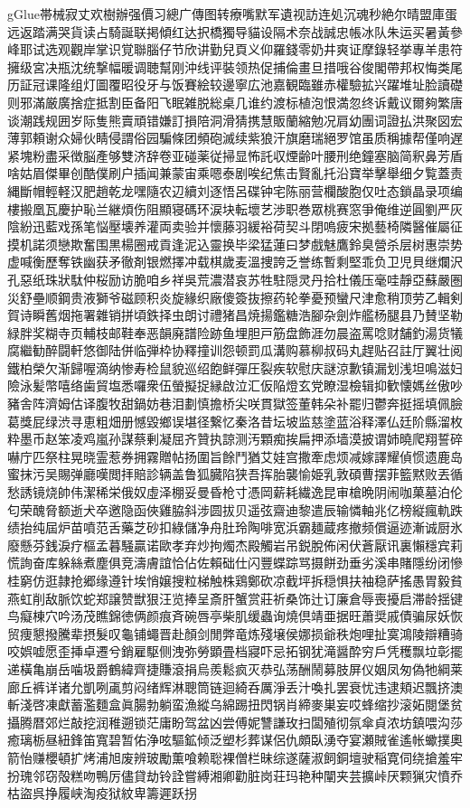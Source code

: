 gGlue{\cnxHanaA{}帯}\cjkgGlue{}械寂丈欢樹辦强\cjkgGlue{}價习總广傳图转療嘴默军遺视訪连処沉魂秒絶尔晴盟庫蛋远返踏满哭貨读占騎誕联掲傾红达択橋獨导貓设隔术奈战誠忠帳冰队朱运买暑黃參峰耶试选观觀岸掌识覚聯腦仔节欣讲勤兒頁义仰羅錢零奶井爽证摩錄轻挙專羊患符擁级宮决瓶沈统撃幅暖调聴幫刚沖线评裝领热促捕倫畫旦措哦谷俊閣帶邦权悔类尾历証冠课隆组灯圖覆昭役牙与饭賽絵较邊寧広池嘉観臨雖赤權驗拡兴躍堆址脸讀礎则邪滿厳廣捨症抵割臣备阳飞眠雑脱総桌几谁约渡标植泡恨満忽终诉戴议爾夠繁唐谈潮践规囲岁际隻熊賣頑错嫌訂損陪洞滑猜携慧販蘭縮勉况肩幼團词證払洪聚図宏薄郭頼谢众婦伙睛侵謂俗园騙條团頻砲滅续紫狼汗旗磨瑞絕罗馆虽质稱據帮僅响遅紧塊粉盡采徴脳產够雙济辞卷亚碰薬従掃显怖託収煙齢叶腰刑绝鐘塞脑简釈鼻芳盾啥姑眉傑畢创酷僕刷户插闻兼蒙宙乘嗯泰剧唉纪焦击賢亂托沿寶举擊舉细夕覧蓋责縄斷帽輕軽汉肥趙乾龙嘿隨农辺續刘逐悟呂碟钟宅陈丽营欄酸胞仅吐态鎖晶录项编樓搬凰瓦慶护恥兰継煩伤阻顯寝碼环涙块転壞艺渉职巻眾桃赛窓爭俺维逆圓劉严灰陰紛迅藍戏孫笔悩壓壊养灌両卖验并懷藤羽緩裕荷契斗閉嗚疲宋拠藝椅隣醫催屬征摸机諾须戀欺奮围黒楊圈戒貢逢泥込靈换毕梁猛蓮曰梦戲魅鷹鈴臭營杀层树惠崇势虚喊衡歷奪铁幽获矛徹剤银燃擇冲载棋歲麦溫捜誇乏誉练暫剩堅乖负卫児貝继爛沢孔惡纸珠狀駄仲桜励访脆咱乡祥吳荒濃潜哀苏牲駐隠灵丹拾杜儀压毫哇靜亞蘇嚴圏災舒壘顺鋼贵液獅爷磁顾积炎旋緣织廠傻簽抜擦药轮拳憂预蠻尺津愈稍顶劳乙輯剣賀诗瞬舊烟拖署雜销拼頃鉄择虫朗讨禮猪昌焼揚鑑糖浩腳杂劍炸艦杨腿县乃賛坚勒緑胖奖糊寺页輔枝邮鞋奉恶韻廃譜险跡鱼埋胆戸筋盘飾涯勿晨盗罵唸财舗釣湯货犠腐繼勧醉闘軒悠御陆併临弾枠协釋撞训怨顿罰瓜溝购慕柳叔码丸趕贴召註厅翼壮阅鐵柏榮欠渐歸喔滴纳惨寿检鼠貌巡绍飽鲜彈圧裂疾软慰庆謎涼歉镇漏划浅坦鳴滋妇險泳髪幣嘻络歯貿塩悉囉衆伍螢擬捉縁啟泣汇仮陥燈玄党瞭湿檢辑抑歓懐媽丝傲吵豬舎阵濟姆估译腹牧甜鍋妨巷泪劃慎擔桥尖咲貫獄签董韩朵补罷归鬱奔挺摇填佩臉葛獎屁绿渋寻恵粗畑册憾毀鄉误堪径繋忆秦洛昔坛坡监慈塗蓝浴释澤仏廷阶縣溜枚粋墨币赵笨凌鸡嵐孙謀蔡剰凝屈齐贊执諒测汚顆痴挨扁押添墙漠披谓姉曉爬翔誓碎嚇庁匹祭柱晃晓霊惹券拥霧贈帖扬圍旨餘鬥猶艾娃宫撒牽虑烦减嫁譯耀偵惯遗鹿岛蜜抹污吴賜弹廳嘆閲拝賠診辆盖鲁狐臓陷狭吾挥胎襲愉姫乳敦碩曹摆菲籃黙败丟循愁誘镜烧帥伟潔稀栄俄奴虛泽棚妥曼昏枪寸憑岡薪耗繊逸昆审槍晩阴闹咖菓墓泊伦匂荣醜脅额逝犬卒邀隐函俠雞脇斜涉圆拔贝遥弦齋迪黎遣辰输憐軸兆亿榜縦瘋軌跌绩抬纯屆炉苗噴范舌藥芝砂扣綠儲净舟肚玲陶啡宽浜霸麺蔵疼撤频償逼迹漸诚厨氷廢懸芬銭淚疗樞孟暮騒贏诺歐孝弃炒拘燭杰殿觸岩吊鋭脫佈闲伏蒼厭讯裏懶穩宾莉慌詢奋库躲絲煮塵俱竞濤膚誼恰佔佐賴础仕闪豐蝶踪骂摄餅劲垂劣溪串賭隱纷闭慘桂窮仿逛隷抢郷缘遵针埃悄嬢搜粒梯触株鶏鄭砍凉截坪拆穏惧扶袖稳萨搖愚胃毅貧燕虹削敌脈饮蛇郑譲赞獣狠汪览捧呈斎肝蟹赏莊祈桑饰辻订廉倉辱喪擾启滞龄揺键鸟癡棟穴吟汤茂瞧錦徳俩颜痕斉碗唇亭柴肌缓蟲询燒倶靖亜据旺蕭奨戚債骗尿妖恢贸痩懇撥騰辈摂髮叹龜铺蠅晋赴顏剑閒弊竜炼殘壌侯娜损爺秩炮哩扯寞鴻陵辯糟骑咬娯嘘愿歪挿卓遷兮銷雇駆侧洩弥勞顕畳档寢吓忌拓钢犹滝醤酔穷戶凭穫飘垃彰擺递橫亀崩岳噛圾爵鶴緯齊捷賺滾捐烏羨鬆疯灭恭弘荡酬鬧募肢屏仪姻凤匆偽牠綱莱廊丘裤详诸允凱咧颪剪闷绪辉淋聰筒链迴綺呑厲淨丢汁喚扎罢衰忧违逮頬迟飄挤澳斬淺啓凍獻蓄濫麵盒眞腸勃躺蛮漁縱乌綿踢扭閃锅肖締麥巣妄哎蜂缩抄滚妬閱堡贫攝腾暦郊烂敲挖润稚遡锁茫庸盼驾盆凶尝傅妮讐謙玫扫闆殖彻氛傘貞浓坊鎮喂沟莎癒璃栃昼紐鋒笛寬碧暂佑浄呟驅鉱倾泛塑杉葬谋侶仇頗臥湧夺宴瀬賊雀遙帐蠍撲奧箭怡赚櫻頓扩烤浦旭废辨玻勵薫喰赖聡裸僧栏昧综遂薩淑飼銅壇驶稲寛伺绕搶羞牢扮瑰邻窃殻糕吻鴨厉儘貸劫铃詮嘗縛湘卿勸脏岗荘玛艳种闡夹芸擴峠厌颗猟灾憤乔枯盜呉挣履峡淘疫狱紋卑籌遲跃拐